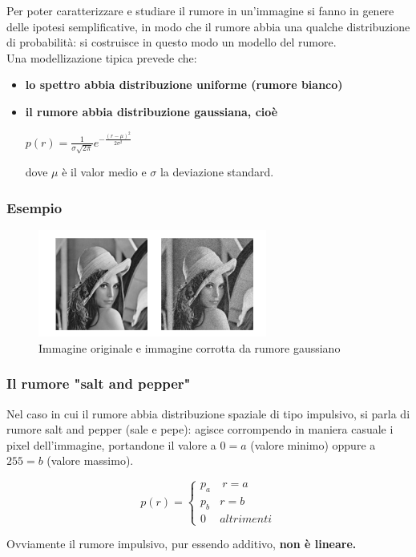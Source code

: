Per poter caratterizzare e studiare il rumore in un'immagine si fanno in genere delle ipotesi semplificative, in modo che il rumore abbia una qualche distribuzione di probabilità: si costruisce in
questo modo un modello del rumore.
\\Una modellizazione tipica prevede che:

\begin{itemize}
    \item \textbf{lo spettro abbia distribuzione uniforme (rumore bianco)}
    \item \textbf{il rumore abbia distribuzione gaussiana, cioè}
          \begin{center}
              $p(r)=\frac{1}{\sigma \sqrt{2 \pi}}e^{-\frac{(r-\mu)^2}{2\sigma^2}}$
          \end{center}
          dove $\mu$ è il valor medio e $\sigma$ la deviazione standard.
\end{itemize}


\subsubsection{Esempio}

\begin{figure}[H]
    \centering
    \includegraphics[width=\linewidth, keepaspectratio]{capitoli/immagini/imgs/esempio-rumore.png}
    \caption*{Immagine originale e immagine corrotta da rumore gaussiano}
\end{figure}

\subsubsection{Il rumore "salt and pepper"}

Nel caso in cui il rumore abbia distribuzione spaziale di tipo impulsivo, si parla di rumore salt and pepper (sale e pepe): agisce
corrompendo in maniera casuale i pixel dell'immagine, portandone il valore a $0=a$ (valore minimo) oppure a $255=b$ (valore massimo).
\begin{center}
    $$
        p(r) = \left\{ \begin{array}{cl}
            p_a & \ r = a    \\
            p_b & r = b      \\
            0   & altrimenti
        \end{array} \right.
    $$
\end{center}
Ovviamente il rumore impulsivo, pur essendo additivo, \textbf{non è
    lineare.}

